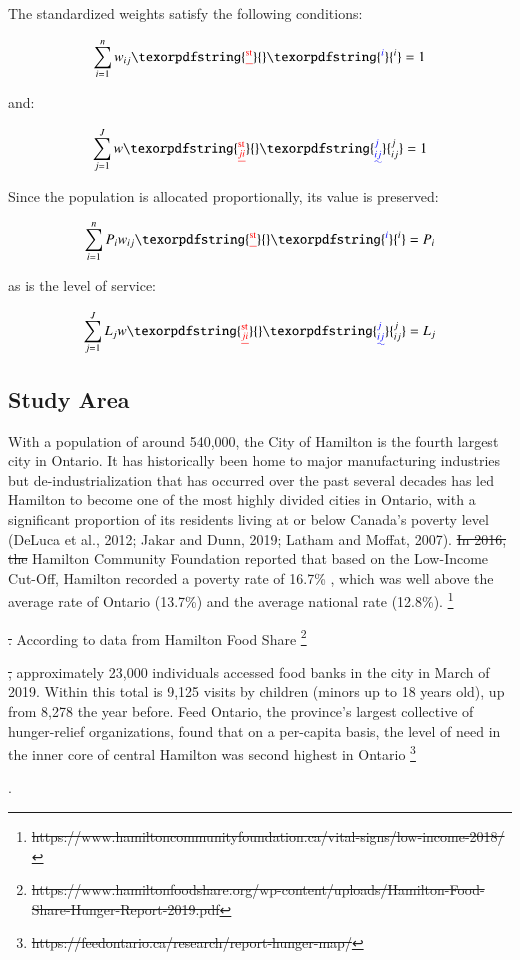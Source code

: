 \documentclass[]{elsarticle} %
\providecommand{\DIFaddtex}[1]{{\protect\color{blue}\uwave{#1}}} %
\providecommand{\DIFdeltex}[1]{{\protect\color{red}\sout{#1}}}                      %
\providecommand{\DIFaddbegin}{} %
\providecommand{\DIFaddend}{} %
\providecommand{\DIFdelbegin}{} %
\providecommand{\DIFdelend}{} %
\providecommand{\DIFadd}[1]{\texorpdfstring{\DIFaddtex{#1}}{#1}} %
\providecommand{\DIFdel}[1]{\texorpdfstring{\DIFdeltex{#1}}{}} %
\newcommand{\DIFscaledelfig}{0.5}
\newlength{\DIFdelgraphicswidth} %
\newlength{\DIFdelgraphicsheight} %
\newcommand{\DIFaddincludegraphics}[2][]{{\color{blue}\fbox{\DIFOincludegraphics[#1]{#2}}}} %
\newcommand{\DIFdelincludegraphics}[2][]{%
\sbox{\DIFdelgraphicsbox}{\DIFOincludegraphics[#1]{#2}}%
\settoboxwidth{\DIFdelgraphicswidth}{\DIFdelgraphicsbox} %
\settoboxtotalheight{\DIFdelgraphicsheight}{\DIFdelgraphicsbox} %
\scalebox{\DIFscaledelfig}{%
\parbox[b]{\DIFdelgraphicswidth}{\usebox{\DIFdelgraphicsbox}\\[-\baselineskip] \rule{\DIFdelgraphicswidth}{0em}}\llap{\resizebox{\DIFdelgraphicswidth}{\DIFdelgraphicsheight}{%
\setlength{\unitlength}{\DIFdelgraphicswidth}%
\begin{picture}(1,1)%
\thicklines\linethickness{2pt} %
{\color[rgb]{1,0,0}\put(0,0){\framebox(1,1){}}}%
{\color[rgb]{1,0,0}\put(0,0){\line( 1,1){1}}}%
{\color[rgb]{1,0,0}\put(0,1){\line(1,-1){1}}}%
\end{picture}%
}\hspace*{3pt}}} %
} %
\DeclareRobustCommand{\DIFaddbegin}{\DIFOaddbegin \let\includegraphics\DIFaddincludegraphics} %
\DeclareRobustCommand{\DIFaddend}{\DIFOaddend \let\includegraphics\DIFOincludegraphics} %
\DeclareRobustCommand{\DIFdelbegin}{\DIFOdelbegin \let\includegraphics\DIFdelincludegraphics} %
\DeclareRobustCommand{\DIFdelend}{\DIFOaddend \let\includegraphics\DIFOincludegraphics} %
\begin{document}
The standardized weights satisfy the following conditions:
\DIFaddbegin 

\DIFaddend \[
\sum_{i=1}^nw_{ij}\DIFdelbegin \DIFdel{^\text{st}}\DIFdelend \DIFaddbegin \DIFadd{^i}\DIFaddend =1
\]

\noindent and:
\DIFaddbegin 

\DIFaddend \[
\sum_{j=1}^Jw\DIFdelbegin \DIFdel{_{ji}^\text{st}}\DIFdelend \DIFaddbegin \DIFadd{_{ij}^j}\DIFaddend =1
\]

Since the population is allocated proportionally, its value is
preserved:
\DIFaddbegin 

\DIFaddend \[
\sum_{i=1}^nP_iw_{ij}\DIFdelbegin \DIFdel{^\text{st}}\DIFdelend \DIFaddbegin \DIFadd{^i}\DIFaddend =P_i
\]

\noindent as is the level of service:
\DIFaddbegin 

\DIFaddend \[
\sum_{j=1}^JL_jw\DIFdelbegin \DIFdel{_{ji}^\text{st}}\DIFdelend \DIFaddbegin \DIFadd{_{ij}^j}\DIFaddend =L_j
\]

\hypertarget{study-area}{%
\subsection{Study Area}\label{study-area}}

With a population of around 540,000, the City of Hamilton is the fourth
largest city in Ontario. It has historically been home to major
manufacturing industries but de-industrialization that has occurred over
the past several decades has led Hamilton to become one of the most
highly divided cities in Ontario, with a significant proportion of its
residents living at or below Canada's poverty level (DeLuca et al.,
2012; Jakar and Dunn, 2019; Latham and Moffat, 2007). \DIFdelbegin \DIFdel{In 2016, the
}\DIFdelend \DIFaddbegin \DIFadd{The }\DIFaddend Hamilton
Community Foundation \DIFaddbegin \DIFadd{(HCF, 2018) }\DIFaddend reported that based on the Low-Income
Cut-Off, Hamilton recorded a poverty rate of 16.7\% \DIFaddbegin \DIFadd{in 2016}\DIFaddend , which was
well above the average rate of Ontario (13.7\%) and the average national
rate (12.8\%). \DIFdelbegin \footnote{\DIFdel{https://www.hamiltoncommunityfoundation.ca/vital-signs/low-income-2018/}}%
\addtocounter{footnote}{-1}%
\DIFdel{.
}\DIFdelend According to data from Hamilton Food Share \DIFdelbegin \footnote{\DIFdel{https://www.hamiltonfoodshare.org/wp-content/uploads/Hamilton-Food-Share-Hunger-Report-2019.pdf}}%
\addtocounter{footnote}{-1}%
\DIFdel{, }\DIFdelend \DIFaddbegin \DIFadd{(HFS, 2019),
}\DIFaddend approximately 23,000 individuals accessed food banks in the city in
March of 2019. Within this total is 9,125 visits by children (minors up
to 18 years old), up from 8,278 the year before. Feed Ontario, the
province's largest collective of hunger-relief organizations, found that
on a per-capita basis, the level of need in the inner core of central
Hamilton was second highest in Ontario \DIFdelbegin \footnote{\DIFdel{https://feedontario.ca/research/report-hunger-map/}}%
\addtocounter{footnote}{-1}%
\DIFdelend \DIFaddbegin \DIFadd{(FO, 2019)}\DIFaddend .
\end{document}
